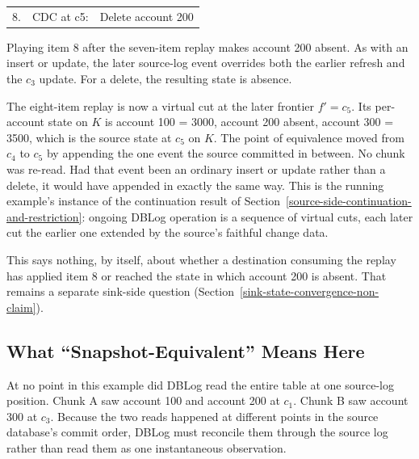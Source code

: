 \documentclass[letterpaper,10pt,twocolumn]{article}
\begin{document}
\begin{center}\ttfamily\footnotesize
\begin{tabular}{@{}r@{\hskip 0.4em}l@{\hskip 1em}l@{}}
8. & CDC at c5: & Delete account 200\\
\end{tabular}
\end{center}

Playing item 8 after the seven-item replay makes account 200 absent. As
with an insert or update, the later source-log event overrides both the
earlier refresh and the $c_3$ update. For a delete, the resulting state
is absence.

The eight-item replay is now a virtual cut at the later frontier
$f' = c_5$. Its per-account state on $K$ is account 100 = 3000, account
200 absent, account 300 = 3500, which is the source state at $c_5$ on
$K$. The point of equivalence moved from $c_4$ to $c_5$ by appending the
one event the source committed in between. No chunk was re-read. Had
that event been an ordinary insert or update rather than a delete, it
would have appended in exactly the same way. This is
the running example's instance of the continuation result of
Section~\ref{source-side-continuation-and-restriction}: ongoing DBLog
operation is a sequence of virtual cuts, each later cut the earlier one
extended by the source's faithful change data.

This says nothing, by itself, about whether a destination consuming the
replay has applied item 8 or reached the state in which account 200 is
absent. That remains a separate sink-side question
(Section~\ref{sink-state-convergence-non-claim}).

\begin{figure}[t]
  
\end{figure}

\subsection{What ``Snapshot-Equivalent'' Means
Here}\label{what-snapshot-equivalent-means-here}

At no point in this example did DBLog read the entire table at one
source-log position. Chunk A saw account 100 and account 200 at
$c_1$. Chunk B saw account 300 at $c_3$. Because the two reads
happened at different points in the source database's commit order,
DBLog must reconcile them through the source log rather than read them
as one instantaneous observation.
\end{document}
